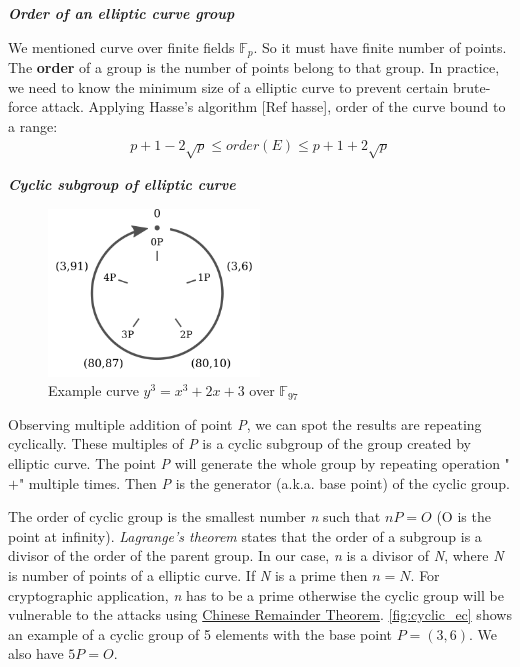 \bigskip
{\textit {\textbf{Order of an elliptic curve group}}}

We mentioned curve over finite fields $\mathbb{F}_{p}$. So it must have finite number of points.
The {\bf order} of a group is the number of points belong to that group.
In practice, we need to know the minimum size of a elliptic curve to prevent certain brute-force attack.
Applying Hasse's algorithm [Ref hasse], order of the curve bound to a range:\medskip
\begin{align*}
  p + 1 - 2\sqrt{p} \leq order(E) \leq p + 1 + 2\sqrt{p}
\end{align*}

\bigskip
{\textit {\textbf{Cyclic subgroup of elliptic curve}}}
\begin{figure}[ht!]
  \centering
  \includegraphics[width=0.5\textwidth]{images/cyclic_ec.png}
  \caption[Example curve $y^3=x^3+2x+3$]{Example curve $y^3=x^3+2x+3$ over $\mathbb{F}_{97}$}
  \label{fig:cyclic_ec}
\end{figure}

Observing multiple addition of point \emph{P}, we can spot the results are repeating cyclically.
These multiples of \emph{P} is a cyclic subgroup of the group created by elliptic curve.
The point \emph{P} will generate the whole group by repeating operation "$+$" multiple times.
Then \emph{P} is the generator (a.k.a. base point) of the cyclic group.

The order of cyclic group is the smallest number \emph{n} such that $nP = O$ (O is the point at infinity).
\emph{Lagrange's theorem} states that the order of a subgroup is a divisor of the order of the parent group.
In our case, \emph{n} is a divisor of \emph{N}, where \emph{N} is number of points of a elliptic curve.
If \emph{N} is a prime then $n = N$.
For cryptographic application, \emph{n} has to be a prime otherwise the cyclic group will be vulnerable to the attacks using \href{https://crypto.stanford.edu/pbc/notes/numbertheory/crt.html}{Chinese Remainder Theorem}.
\autoref{fig:cyclic_ec} shows an example of a cyclic group of 5 elements with the base point $P = (3,6)$.
We also have $5P = O$.

